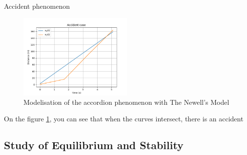 \documentclass{beamer}
\begin{document}
\begin{frame}{Accident phenomenon}
    \begin{figure}
    	\includegraphics[width=0.5\textwidth]{1W2_Acc2.png}
    	\caption{Modelisation of the accordion phenomenon with The Newell's Model}
    	\label{fig:ACC}
    \end{figure}
    \begin{block}{}
    	On the figure \ref{fig:ACC}, you can see that when the curves intersect, there is an accident
    \end{block}
\end{frame}
\subsection{Study of Equilibrium and Stability}
\end{document}
